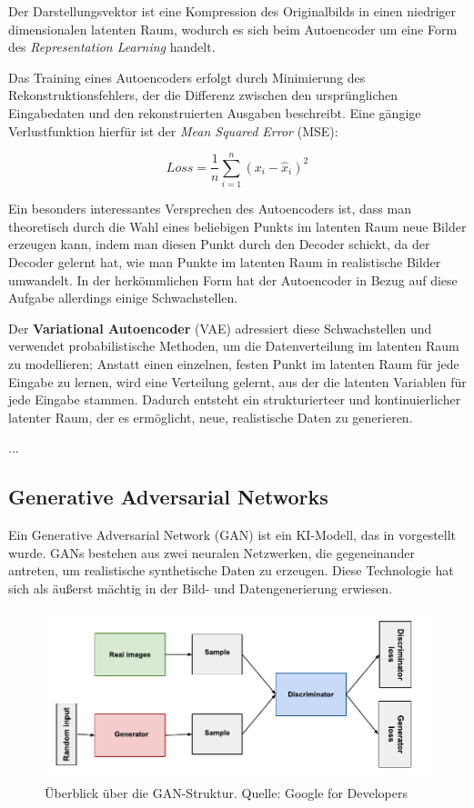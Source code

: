 Der Darstellungsvektor ist eine Kompression des Originalbilds in einen niedriger dimensionalen latenten Raum, wodurch es sich beim Autoencoder um eine Form des \textit{Representation Learning} handelt.

Das Training eines Autoencoders erfolgt durch Minimierung des Rekonstruktionsfehlers, der die Differenz zwischen den ursprünglichen Eingabedaten und den rekonstruierten Ausgaben beschreibt. Eine gängige Verlustfunktion hierfür ist der \textit{Mean Squared Error} (MSE):

\begin{equation} \label{eq-loss-mse}
	Loss=\frac{1}{n}\sum_{i=1}^n (x_i-\hat{x}_i)^2
\end{equation}

Ein besonders interessantes Versprechen des Autoencoders ist, dass man theoretisch durch die Wahl eines beliebigen Punkts im latenten Raum neue Bilder erzeugen kann, indem man diesen Punkt durch den Decoder schickt, da der Decoder gelernt hat, wie man Punkte im latenten Raum in realistische Bilder umwandelt. \parencite{Foster2020gendeeplearning} In der herkömmlichen Form hat der Autoencoder in Bezug auf diese Aufgabe allerdings einige Schwachstellen.

Der \textbf{Variational Autoencoder} (VAE) adressiert diese Schwachstellen und verwendet probabilistische Methoden, um die Datenverteilung im latenten Raum zu modellieren; Anstatt einen einzelnen, festen Punkt im latenten Raum für jede Eingabe zu lernen, wird eine Verteilung gelernt, aus der die latenten Variablen für jede Eingabe stammen. Dadurch entsteht ein strukturierteer und kontinuierlicher latenter Raum, der es ermöglicht, neue, realistische Daten zu generieren. %

...

\subsection{Generative Adversarial Networks} \label{subsec-gan}

Ein Generative Adversarial Network (GAN) ist ein KI-Modell, das in \cite{} vorgestellt wurde. GANs bestehen aus zwei neuralen Netzwerken, die gegeneinander antreten, um realistische synthetische Daten zu erzeugen. Diese Technologie hat sich als äußerst mächtig in der Bild- und Datengenerierung erwiesen.

\begin{figure}[h]
	\label{figure-gan}
	\includegraphics{figure_gan.pdf}
	\caption{Überblick über die GAN-Struktur. Quelle: Google for Developers}
\end{figure}

